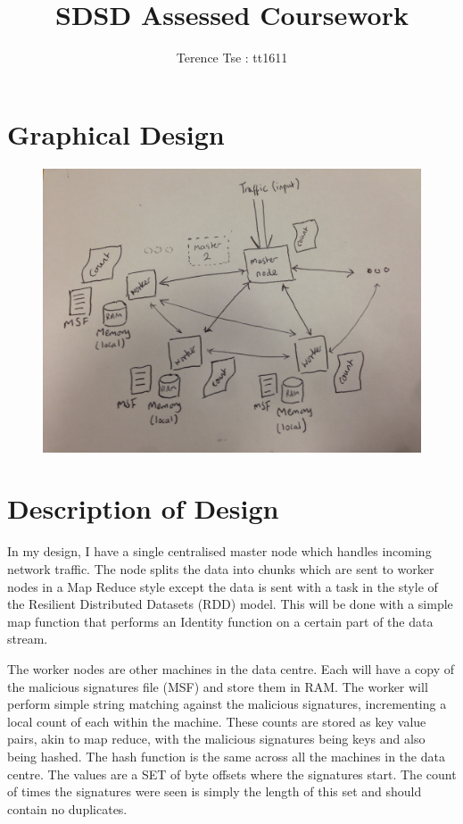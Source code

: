 \documentclass[11pt]{article}
\begin{document}
\title{SDSD Assessed Coursework}
\author{Terence Tse : tt1611}
\maketitle
\newpage

\section{Graphical Design}
\begin{figure}[H]
\centering
\includegraphics[scale=0.125]{pics/SDSD.jpg}
\end{figure}

\section{Description of Design}
In my design, I have a single centralised master node which
handles incoming network traffic. The node splits the
data into chunks which are sent to worker
nodes in a Map Reduce style except the data is sent with a task
in the style of the Resilient Distributed Datasets (RDD) model. This
will be done with a simple map function that performs an Identity 
function on a certain part of the data stream.

The worker nodes are other machines in the data centre. Each will
have a copy of the malicious signatures file (MSF) and store them in RAM.  
The worker will perform simple string matching against the 
malicious signatures, incrementing a local count of each within the
machine. These counts are stored as key value pairs, akin to map
reduce, with the malicious signatures being keys and
also being hashed. The hash function is the same across all the
machines in the data centre. The values are a SET of byte offsets
where the signatures start. The count of times the signatures were
seen is simply the length of this set and should contain no duplicates.
\end{document}
